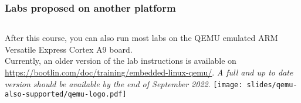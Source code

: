 \begin{frame}
\frametitle{Labs proposed on another platform}
  \begin{columns}
    After this course, you can also run most labs on the QEMU emulated
    ARM Versatile Express Cortex A9 board.\\
    \vspace{1em}
    Currently, an older version of the lab instructions is available on
    \url{https://bootlin.com/doc/training/embedded-linux-qemu/}. {\em A full
    and up to date version should be available by the end of September 2022}.
    \texttt{[image: slides/qemu-also-supported/qemu-logo.pdf]}
  \end{columns}
  \vspace{1cm}
\end{frame}
